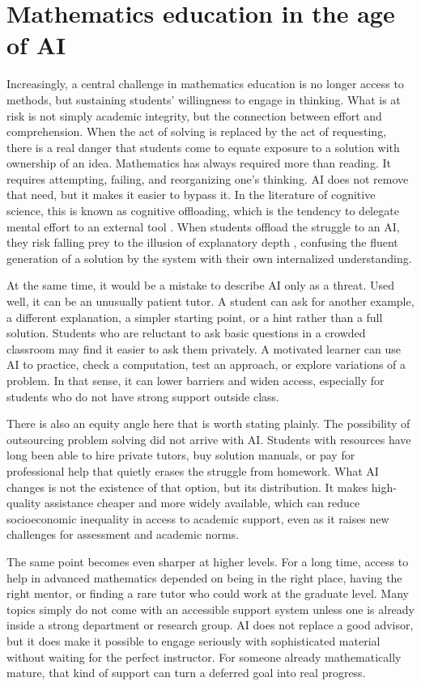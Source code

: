 \documentclass[12pt]{article}
\begin{document}
\section{Mathematics education in the age of AI}

Increasingly, a central challenge in mathematics education is no longer access to methods, but sustaining students' willingness to engage in thinking. What is at risk is not simply academic integrity, but the connection between effort and comprehension. When the act of solving is replaced by the act of requesting, there is a real danger that students come to equate exposure to a solution with ownership of an idea. Mathematics has always required more than reading. It requires attempting, failing, and reorganizing one's thinking. AI does not remove that need, but it makes it easier to bypass it. In the literature of cognitive science, this is known as cognitive offloading, which is the tendency to delegate mental effort to an external tool \cite{risko2016}. When students offload the struggle to an AI, they risk falling prey to the illusion of explanatory depth \cite{rozenblit2002}, confusing the fluent generation of a solution by the system with their own internalized understanding.

At the same time, it would be a mistake to describe AI only as a threat. Used well, it can be an unusually patient tutor. A student can ask for another example, a different explanation, a simpler starting point, or a hint rather than a full solution. Students who are reluctant to ask basic questions in a crowded classroom may find it easier to ask them privately. A motivated learner can use AI to practice, check a computation, test an approach, or explore variations of a problem. In that sense, it can lower barriers and widen access, especially for students who do not have strong support outside class.

There is also an equity angle here that is worth stating plainly. The possibility of outsourcing problem solving did not arrive with AI. Students with resources have long been able to hire private tutors, buy solution manuals, or pay for professional help that quietly erases the struggle from homework. What AI changes is not the existence of that option, but its distribution. It makes high-quality assistance cheaper and more widely available, which can reduce socioeconomic inequality in access to academic support, even as it raises new challenges for assessment and academic norms.

The same point becomes even sharper at higher levels. For a long time, access to help in advanced mathematics depended on being in the right place, having the right mentor, or finding a rare tutor who could work at the graduate level. Many topics simply do not come with an accessible support system unless one is already inside a strong department or research group. AI does not replace a good advisor, but it does make it possible to engage seriously with sophisticated material without waiting for the perfect instructor. For someone already mathematically mature, that kind of support can turn a deferred goal into real progress.
\end{document}
